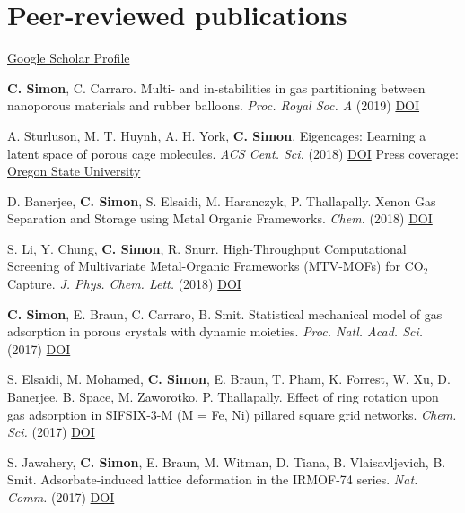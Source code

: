 \documentclass[10pt,a4paper,sans]{moderncv}        %
\begin{document}
\section{Peer-reviewed publications}
\href{https://scholar.google.com/citations?user=eoR8MNMAAAAJ&hl=en}{Google Scholar Profile}
\begin{etaremune}[itemsep=0pt]
\item \textbf{C. Simon}, C. Carraro. Multi- and in-stabilities in gas partitioning between nanoporous materials and rubber balloons.
\emph{Proc. Royal Soc. A} (2019) \href{https://chemrxiv.org/articles/Multi-_and_In-Stabilities_in_Gas_Partitioning_Between_Nanoporous_Materials_and_Rubber_Balloons/7135928}{DOI} 
\item A. Sturluson, M. T. Huynh, A. H. York, \textbf{C. Simon}.
Eigencages: Learning a latent space of porous cage molecules.
\emph{ACS Cent. Sci.} (2018) \href{http://dx.doi.org/10.1021/acscentsci.8b00638}{DOI} Press coverage: \href{https://today.oregonstate.edu/news/machine-learning-research-osu-unlocking-molecular-cages\%E2\%80\%99-energy-saving-potential}{Oregon State University}
\item D. Banerjee, \textbf{C. Simon}, S. Elsaidi, M. Haranczyk, P. Thallapally.
Xenon Gas Separation and Storage using Metal Organic Frameworks.
\emph{Chem.} (2018) \href{https://doi.org/10.1016/j.chempr.2017.12.025}{DOI}
\item S. Li, Y. Chung, \textbf{C. Simon}, R. Snurr. High-Throughput Computational Screening of Multivariate Metal-Organic Frameworks (MTV-MOFs) for CO$_2$ Capture. \emph{J. Phys. Chem. Lett.} (2018) \href{http://dx.doi.org/10.1021/acs.jpclett.7b02700}{DOI}
\item \textbf{C. Simon}, E. Braun, C. Carraro, B. Smit. Statistical mechanical model of gas adsorption in porous crystals with dynamic moieties. \emph{Proc. Natl. Acad. Sci.} (2017) \href{http://dx.doi.org/10.1073/pnas.1613874114}{DOI} 
\item S. Elsaidi, M. Mohamed, \textbf{C. Simon}, E. Braun, T. Pham, K. Forrest, W. Xu, D. Banerjee, B. Space, M. Zaworotko, P. Thallapally. Effect of ring rotation upon gas adsorption in SIFSIX-3-M (M = Fe, Ni) pillared square grid networks. \emph{Chem. Sci.} (2017) \href{http://dx.doi.org/10.1039/C6SC05012C}{DOI} 
\item S. Jawahery, \textbf{C. Simon}, E. Braun, M. Witman, D. Tiana, B. Vlaisavljevich, B. Smit. Adsorbate-induced lattice deformation in the IRMOF-74 series. \emph{Nat. Comm.} (2017) \href{http://www.nature.com/articles/ncomms13945}{DOI}

\end{etaremune}
\end{document}
